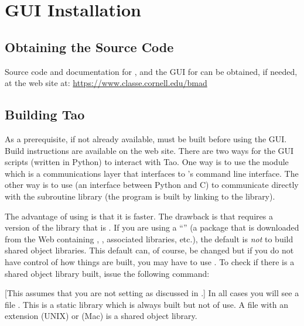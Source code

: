 \chapter{GUI Installation}
\label{s:gui.install}

\section{Obtaining the Source Code}

Source code and documentation for \bmad, \tao and the GUI for \tao can be obtained, if needed, at
the \bmad web site at:
  \hfill\break \hspace*{0.3in} \url{https://www.classe.cornell.edu/bmad}

\section{Building Tao}
\label{s:building}

As a prerequisite, if not already available, \tao must be built before using the GUI. Build
instructions are available on the \bmad web site. There are two ways for the GUI scripts (written in
Python) to interact with Tao. One way is to use the  module which is a communications
layer that interfaces to \tao's command line interface. The other way is to use  (an
interface between Python and C) to communicate directly with the \tao subroutine library (the \tao
program is built by linking to the \tao library). 

The advantage of using  is that it is faster. The drawback is that  requires a
version of the \tao library that is . If you are using a \bmad
``'' (a package that is downloaded from the Web containing \bmad, \tao, associated
libraries, etc.), the default is {\em not} to build shared object libraries. This default can, of
course, be changed but if you do not have control of how things are built, you may have to use
. To check if there is a shared object library built, issue the following command:
[This assumes that you are not setting  as discussed in .]
In all cases you will see a file . This is a static library which is always built but
not of use. A file with an extension  (UNIX) or  (Mac) is a shared object library. 

